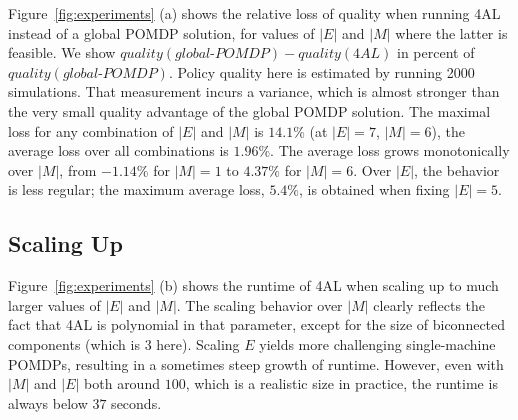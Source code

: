 Figure~\ref{fig:experiments} (a) shows the relative loss of quality
when running 4AL instead of a global POMDP solution, for values of
$|E|$ and $|M|$ where the latter is feasible. %
We show
$\mathit{quality}(\mathit{global\mbox{-}POMDP})-\mathit{quality}(\mathit{4AL})$
in percent of $\mathit{quality}(\mathit{global\mbox{-}POMDP})$. Policy
quality here is estimated by running 2000 simulations. That
measurement incurs a variance, which is almost stronger than the very
small quality advantage of the global POMDP solution. The maximal loss
for any combination of $|E|$ and $|M|$ is $14.1\%$ (at $|E|=7$,
$|M|=6$), the average loss over all combinations is $1.96\%$. The
average loss grows monotonically over $|M|$, from $-1.14\%$ for
$|M|=1$ to $4.37\%$ for $|M|=6$. Over $|E|$, the behavior is less
regular; the maximum average loss, $5.4\%$, is obtained when fixing
$|E|=5$.



\subsection{Scaling Up}
\label{experiments:scaling}

Figure~\ref{fig:experiments} (b) shows the runtime of 4AL when scaling
up to much larger values of $|E|$ and $|M|$. The scaling behavior over
$|M|$ clearly reflects the fact that 4AL is polynomial in that
parameter, except for the size of biconnected components (which is $3$
here). Scaling $E$ yields more challenging single-machine POMDPs,
resulting in a sometimes steep growth of runtime. However, even with
$|M|$ and $|E|$ both around $100$, which is a realistic size in
practice, the runtime is always below $37$ seconds.

